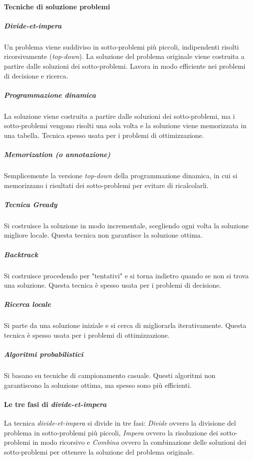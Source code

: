     \paragraph{Tecniche di soluzione problemi}
        \subparagraph{\textit{Divide-et-impera}} Un problema viene suddiviso in sotto-problemi più piccoli, indipendenti risolti ricorsivamente (\textit{top-down}). La soluzione del problema originale viene costruita a partire dalle soluzioni dei sotto-problemi. Lavora in modo efficiente nei problemi di decisione e ricerca.
        \subparagraph{Programmazione dinamica} La soluzione viene costruita a partire dalle soluzioni dei sotto-problemi, ma i sotto-problemi vengono risolti una sola volta e la soluzione viene memorizzata in una tabella. Tecnica spesso usata per i problemi di ottimizzazione.
        \subparagraph{\textit{Memorization} (o annotazione)} Semplicemente la versione \textit{top-down} della programmazione dinamica, in cui si memorizzano i risultati dei sotto-problemi per evitare di ricalcolarli.
        \subparagraph{Tecnica \textit{Gready}} Si costruisce la soluzione in modo incrementale, scegliendo ogni volta la soluzione migliore locale. Questa tecnica non garantisce la soluzione ottima.
        \subparagraph{\textit{Backtrack}} Si costruisce procedendo per "tentativi" e si torna indietro quando se non si trova una soluzione. Questa tecnica è spesso usata per i problemi di decisione.
        \subparagraph{Ricerca locale} Si parte da una soluzione iniziale e si cerca di migliorarla iterativamente. Questa tecnica è spesso usata per i problemi di ottimizzazione.
        \subparagraph{Algoritmi probabilistici} Si basano su tecniche di campionamento casuale. Questi algoritmi non garantiscono la soluzione ottima, ma spesso sono più efficienti.
    \paragraph{Le tre fasi di \textit{divide-et-impera}} La tecnica \textit{divide-et-impera} si divide in tre fasi: \textit{Divide} ovvero la divisione del problema in sotto-problemi più piccoli, \textit{Impera} ovvero la risoluzione dei sotto-problemi in modo ricorsivo e \textit{Combina} ovvero la combinazione delle soluzioni dei sotto-problemi per ottenere la soluzione del problema originale.
